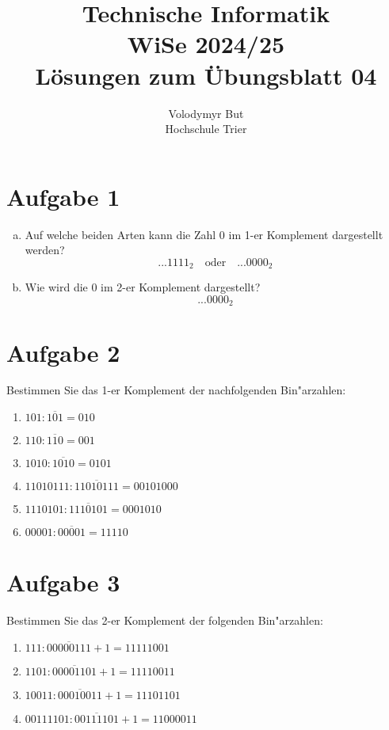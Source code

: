 \documentclass[10pt, oneside]{article}
\title{Technische Informatik\\[10pt]\Large{WiSe 2024/25}\\[15pt]\Large{L{\"o}sungen zum {\"U}bungsblatt 04}}
\author{Volodymyr But\\[10pt]Hochschule Trier}
\date{}
\begin{document}
\sloppy

\maketitle
\vspace{25px}

\section{Aufgabe 1}

\begin{enumerate}[(a)]
    \item Auf welche beiden Arten kann die Zahl 0 im 1-er Komplement dargestellt werden?
        \begin{equation*}
            ...1111_{2} \quad\text{oder}\quad ...0000_{2}
        \end{equation*}
    \item Wie wird die 0 im 2-er Komplement dargestellt?
        \begin{equation*}
            ...0000_{2}
        \end{equation*}
\end{enumerate}

\section{Aufgabe 2}

Bestimmen Sie das 1-er Komplement der nachfolgenden Bin"arzahlen:
\begin{enumerate}
    \item $101 : \overline{101} = 010$
    \item $110 : \overline{110} = 001$
    \item $1010 : \overline{1010} = 0101$
    \item $11010111 : \overline{11010111} = 00101000$
    \item $1110101 : \overline{1110101} = 0001010$
    \item $00001 : \overline{00001} = 11110$
\end{enumerate}

\section{Aufgabe 3}

Bestimmen Sie das 2-er Komplement der folgenden Bin"arzahlen:
\begin{enumerate}
    \item $111 : \overline{00000111} + 1 = 11111001$
    \item $1101 : \overline{00001101} + 1 = 11110011$
    \item $10011 : \overline{00010011} + 1 = 11101101$
    \item $00111101 : \overline{00111101} + 1 = 11000011$
\end{enumerate}
\end{document}
